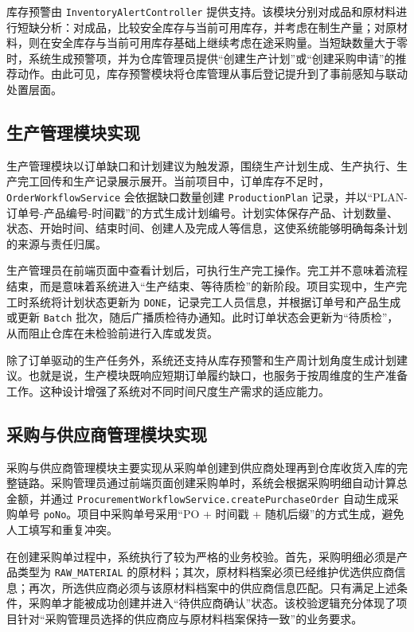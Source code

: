 库存预警由 \texttt{InventoryAlertController} 提供支持。该模块分别对成品和原材料进行短缺分析：对成品，比较安全库存与当前可用库存，并考虑在制生产量；对原材料，则在安全库存与当前可用库存基础上继续考虑在途采购量。当短缺数量大于零时，系统生成预警项，并为仓库管理员提供“创建生产计划”或“创建采购申请”的推荐动作。由此可见，库存预警模块将仓库管理从事后登记提升到了事前感知与联动处置层面。

\subsection{生产管理模块实现}

生产管理模块以订单缺口和计划建议为触发源，围绕生产计划生成、生产执行、生产完工回传和生产记录展示展开。当前项目中，订单库存不足时，\texttt{OrderWorkflowService} 会依据缺口数量创建 \texttt{ProductionPlan} 记录，并以“PLAN-订单号-产品编号-时间戳”的方式生成计划编号。计划实体保存产品、计划数量、状态、开始时间、结束时间、创建人及完成人等信息，这使系统能够明确每条计划的来源与责任归属。

生产管理员在前端页面中查看计划后，可执行生产完工操作。完工并不意味着流程结束，而是意味着系统进入“生产结束、等待质检”的新阶段。项目实现中，生产完工时系统将计划状态更新为 \texttt{DONE}，记录完工人员信息，并根据订单号和产品生成或更新 \texttt{Batch} 批次，随后广播质检待办通知。此时订单状态会更新为“待质检”，从而阻止仓库在未检验前进行入库或发货。

除了订单驱动的生产任务外，系统还支持从库存预警和生产周计划角度生成计划建议。也就是说，生产模块既响应短期订单履约缺口，也服务于按周维度的生产准备工作。这种设计增强了系统对不同时间尺度生产需求的适应能力。

\subsection{采购与供应商管理模块实现}

采购与供应商管理模块主要实现从采购单创建到供应商处理再到仓库收货入库的完整链路。采购管理员通过前端页面创建采购单时，系统会根据采购明细自动计算总金额，并通过 \texttt{ProcurementWorkflowService.createPurchaseOrder} 自动生成采购单号 \texttt{poNo}。项目中采购单号采用“PO + 时间戳 + 随机后缀”的方式生成，避免人工填写和重复冲突。

在创建采购单过程中，系统执行了较为严格的业务校验。首先，采购明细必须是产品类型为 \texttt{RAW\_MATERIAL} 的原材料；其次，原材料档案必须已经维护优选供应商信息；再次，所选供应商必须与该原材料档案中的供应商信息匹配。只有满足上述条件，采购单才能被成功创建并进入“待供应商确认”状态。该校验逻辑充分体现了项目针对“采购管理员选择的供应商应与原材料档案保持一致”的业务要求。

